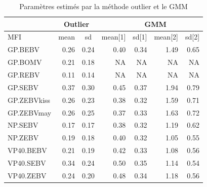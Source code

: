 \begin{table} [H]

\caption{Paramètres estimés par la méthode outlier et le GMM}
\centering
\begin{tabular}{|l|rc|rrrr|}
\hline
 & \multicolumn{2}{c|}{Outlier} & & \multicolumn{2}{c}{GMM} & \\ \hline
MFI & mean & sd & mean{[}1{]} & \multicolumn{1}{r|}{sd{[}1{]}} & mean{[}2{]} & sd{[}2{]} \\ \hline
GP.BEBV     & 0.26          & 0.24         & 0.40        & \multicolumn{1}{r|}{0.34}      & 1.49        & 0.65      \\
GP.BOMV     & 0.21          & 0.18         & NA          & \multicolumn{1}{r|}{NA}        & NA          & NA        \\
GP.REBV     & 0.11          & 0.14         & NA          & \multicolumn{1}{r|}{NA}        & NA          & NA        \\
GP.SEBV     & 0.37          & 0.30         & 0.45        & \multicolumn{1}{r|}{0.37}      & 1.94        & 0.79      \\
GP.ZEBVkiss & 0.26          & 0.23         & 0.38        & \multicolumn{1}{r|}{0.32}      & 1.59        & 0.71      \\
GP.ZEBVmay  & 0.26          & 0.25         & 0.37        & \multicolumn{1}{r|}{0.33}      & 1.63        & 0.72      \\
NP.SEBV     & 0.17          & 0.17         & 0.38        & \multicolumn{1}{r|}{0.32}      & 1.19        & 0.62      \\
NP.ZEBV     & 0.19          & 0.18         & 0.40        & \multicolumn{1}{r|}{0.32}      & 1.05        & 0.55      \\
VP40.BEBV   & 0.21          & 0.19         & 0.42        & \multicolumn{1}{r|}{0.33}      & 1.08        & 0.56      \\
VP40.SEBV   & 0.34          & 0.24         & 0.50        & \multicolumn{1}{r|}{0.35}      & 1.14        & 0.54      \\
VP40.ZEBV   & 0.24          & 0.20         & 0.48        & \multicolumn{1}{r|}{0.34}      & 1.18        & 0.56      \\ \hline
\end{tabular}
\end{table}
